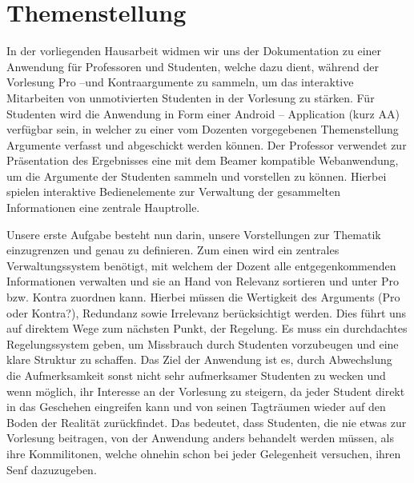 \chapter{Themenstellung}
\label{chap:intro}

In der vorliegenden Hausarbeit widmen wir uns der Dokumentation zu einer Anwendung für Professoren und Studenten, welche dazu dient, während der Vorlesung Pro –und Kontraargumente zu sammeln, um das interaktive Mitarbeiten von unmotivierten Studenten in der Vorlesung zu stärken. Für Studenten wird die Anwendung in Form einer Android – Application (kurz AA) verfügbar sein, in welcher zu einer vom Dozenten vorgegebenen Themenstellung Argumente verfasst und abgeschickt werden können. Der Professor verwendet zur Präsentation des Ergebnisses eine mit dem Beamer kompatible Webanwendung, um die Argumente der Studenten sammeln und vorstellen zu können. Hierbei spielen interaktive Bedienelemente zur Verwaltung der gesammelten Informationen eine zentrale Hauptrolle. 

Unsere erste Aufgabe besteht nun darin, unsere Vorstellungen zur Thematik einzugrenzen und genau zu definieren.  Zum einen wird ein zentrales Verwaltungssystem benötigt, mit welchem der Dozent alle entgegenkommenden Informationen verwalten und sie an Hand von Relevanz sortieren und unter Pro bzw. Kontra zuordnen kann. Hierbei müssen die Wertigkeit des Arguments (Pro oder Kontra?), Redundanz sowie Irrelevanz berücksichtigt werden. Dies führt uns auf direktem Wege zum nächsten Punkt, der Regelung. Es muss ein durchdachtes Regelungssystem geben, um Missbrauch durch Studenten vorzubeugen und eine klare Struktur zu schaffen. Das Ziel der Anwendung ist es, durch Abwechslung die Aufmerksamkeit sonst nicht sehr aufmerksamer Studenten zu wecken und wenn möglich, ihr Interesse an der Vorlesung zu steigern, da jeder Student direkt in das Geschehen eingreifen kann und von seinen Tagträumen wieder auf den Boden der Realität zurückfindet. Das bedeutet, dass Studenten, die nie etwas zur Vorlesung beitragen, von der Anwendung anders behandelt werden müssen, als ihre Kommilitonen, welche ohnehin schon bei jeder Gelegenheit versuchen, ihren Senf dazuzugeben. 